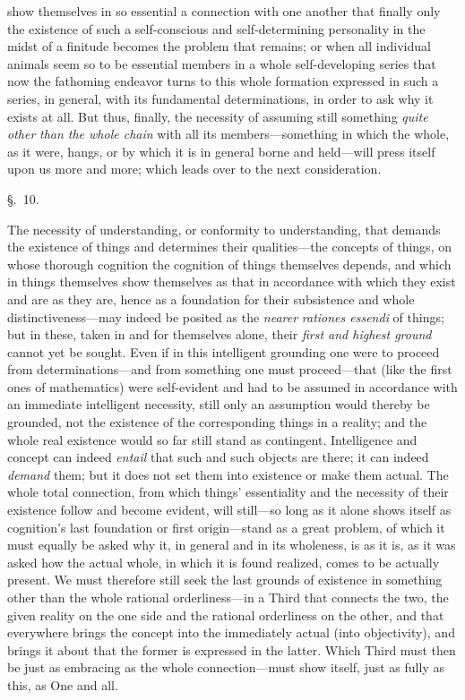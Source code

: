 \documentclass[12pt,a4paper]{book}
\begin{document}
show themselves in so essential a connection with one another that finally only the
existence of such a self-conscious and self-determining personality in the midst of
a finitude becomes the problem that remains; or when all individual animals seem so
to be essential members in a whole self-developing series that now the fathoming
endeavor turns to this whole formation expressed in such a series, in general, with
its fundamental determinations, in order to ask why it exists at all. But thus,
finally, the necessity of assuming still something \emph{quite other} \emph{than the
whole chain} with all its members---something in which the whole, as it were, hangs,
or by which it is in general borne and held---will press itself upon us more and
more; which leads over to the next consideration.

\begin{center}\large\S.~10.\end{center}
The necessity of understanding, or conformity to understanding, that demands the
existence of things and determines their qualities---the concepts of things, on
whose thorough cognition the cognition of things themselves depends, and which in
things themselves show themselves as that in accordance with which they exist and
are as they are, hence as a foundation for their subsistence and whole
distinctiveness---may indeed be posited as the \emph{nearer} \textit{rationes
essendi} of things; but in these, taken in and for themselves alone, their
\emph{first and highest ground} cannot yet be sought. Even if in this intelligent
grounding one were to proceed from determinations---and from something one must
proceed---that (like the first ones of mathematics) were self-evident and had to be
assumed in accordance with an immediate intelligent necessity, still only an
assumption would thereby be grounded, not the existence of the corresponding things
in a reality; and the whole real existence would so far still stand as contingent.
Intelligence and concept can indeed \emph{entail} that such and such objects are
there; it can indeed \emph{demand} them; but it does not set them into existence or
make them actual. The whole total connection, from which things' essentiality and
the necessity of their existence follow and become evident, will still---so long as
it alone shows itself as cognition's last foundation or first origin---stand as a
great problem, of which it must equally be asked why it, in general and in its
wholeness, is as it is, as it was asked how the actual whole, in which it is found
realized, comes to be actually present. We must therefore still seek the last
grounds of existence in something other than the whole rational orderliness---in a
Third that connects the two, the given reality on the one side and the rational
orderliness on the other, and that everywhere brings the concept into the
immediately actual (into objectivity), and brings it about that the former is
expressed in the latter. Which Third must then be just as embracing as the whole
connection---must show itself, just as fully as this, as One and all.
\end{document}
